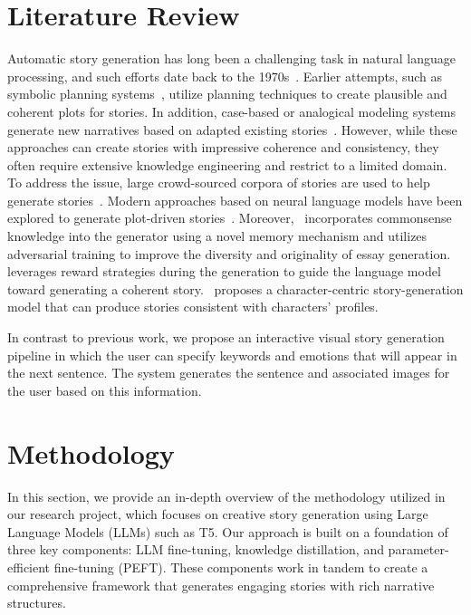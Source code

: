 \documentclass[letterpaper]{article}
\begin{document}
\section{Literature Review}
Automatic story generation has long been a challenging task in natural language processing, and such efforts date back to the 1970s~\cite{Meehan1977TALESPINAI}. Earlier attempts, such as symbolic planning systems~\cite{Riedl_2010}, utilize planning techniques to create plausible and coherent plots for stories. In addition, case-based or analogical modeling systems generate new narratives based on adapted existing stories~\cite{Gervs2005StoryPG}. However, while these approaches can create stories with impressive coherence and consistency, they often require extensive knowledge engineering and restrict to a limited domain. To address the issue, large crowd-sourced corpora of stories are used to help generate stories~\cite{10.1145/2362394.2362398,Li}. Modern approaches based on neural language models have been explored to generate plot-driven stories~\cite{fan-etal-2018-hierarchical}.
Moreover,~\cite{yang-etal-2019-enhancing-topic} incorporates commonsense knowledge into the generator using a novel memory mechanism and utilizes adversarial training to improve the diversity and originality of essay generation.~\cite{Tambwekar2019ControllableNS} leverages reward strategies during the generation to guide the language model toward generating a coherent story.~\cite{Liu_Li_Yu_Huang_Liu_Zhao_Yan_2020} proposes a character-centric story-generation model that can produce stories consistent with characters' profiles. 

In contrast to previous work, we propose an interactive visual story generation pipeline in which the user can specify keywords and emotions that will appear in the next sentence. The system generates the sentence and associated images for the user based on this information.

\section{Methodology}
In this section, we provide an in-depth overview of the methodology utilized in our research project, which focuses on creative story generation using Large Language Models (LLMs) such as T5. Our approach is built on a foundation of three key components: LLM fine-tuning, knowledge distillation, and parameter-efficient fine-tuning (PEFT). These components work in tandem to create a comprehensive framework that generates engaging stories with rich narrative structures.
\end{document}
